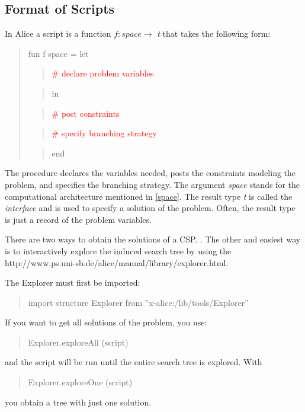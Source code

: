 \documentclass[a4paper,halfparskip]{scrartcl}
\begin{document}
\subsection{Format of Scripts}
In Alice a script is a function $ f : space \rightarrow $ \emph{t} 
that takes the following form:
\begin{quote}
fun f space = let
\begin{quote}
\hspace{15mm}\textcolor{red}{\# declare problem variables}
\end{quote} 
\begin{quote}
\hspace{15mm} in
\end{quote} 
\begin{quote}
\hspace{15mm}\textcolor{red}{\# post constraints}
\end{quote} 
\begin{quote}
\hspace{15mm}\textcolor{red}{\# specify branching strategy}
\end{quote} 
\begin{quote}
\hspace{15mm}end
\end{quote}             
\end{quote}


The procedure declares the variables needed, 
posts the constraints modeling the problem, 
and specifies the branching strategy.
The argument \emph{space} stands for the 
computational architecture mentioned in 
\ref{space}.
The result type \emph{t} is called 
the \emph{interface} and is used to specify
a solution of the problem.
Often, the result type is just a record of the 
problem variables.

There are two ways to obtain the solutions of a 
CSP. . 
The other
and easiest way is to interactively explore the 
induced search tree by using the
\htmladdnormallink{\textcolor{blue}{Explorer}}
{http://www.ps.uni-sb.de/alice/manual/library/explorer.html}.

The Explorer  must first be imported:
\begin{quote}
import structure Explorer from ''x-alice:/lib/tools/Explorer''
\end{quote}
If you want to get all solutions of the problem, 
you use:
\begin{quote}
Explorer.exploreAll (script)
\end{quote}
and the script will be run until the entire 
search tree is explored.
With 
\begin{quote}
Explorer.exploreOne (script)
\end{quote}
you obtain a tree with just one solution.
\end{document}
